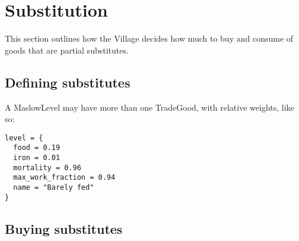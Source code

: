 \section{Substitution}

This section outlines how the Village decides how much to buy and
consume of goods that are partial substitutes.

\subsection{Defining substitutes}

A MaslowLevel may have more than one TradeGood, with relative weights,
like so:
\begin{verbatim}
level = {
  food = 0.19
  iron = 0.01
  mortality = 0.96
  max_work_fraction = 0.94
  name = "Barely fed"
}
\end{verbatim}

\subsection{Buying substitutes}

